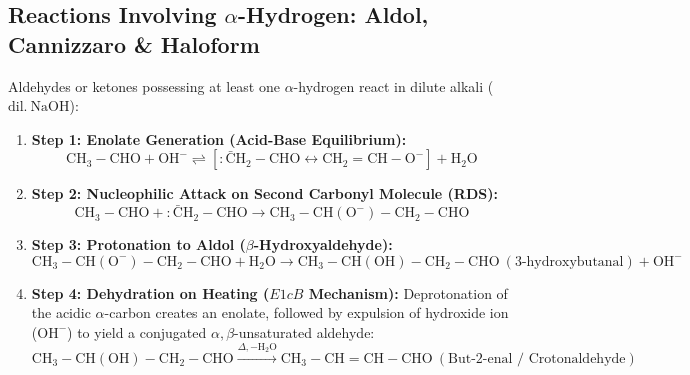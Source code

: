 \documentclass[10pt,a4paper]{article}
\begin{document}
\subsection{Reactions Involving \texorpdfstring{$\alpha$}{alpha}-Hydrogen: Aldol, Cannizzaro \& Haloform}

\begin{formulabox}
Aldehydes or ketones possessing at least one $\alpha$-hydrogen react in dilute alkali ($\mathrm{dil.\ NaOH}$):
\begin{enumerate}[leftmargin=*]
  \item \textbf{Step 1: Enolate Generation (Acid-Base Equilibrium):}
  \begin{equation}
    \mathrm{CH_3-CHO} + \mathrm{OH^-} \rightleftharpoons [\mathrm{:\bar{C}H_2-CHO} \longleftrightarrow \mathrm{CH_2=CH-O^-}] + \mathrm{H_2O}
  \end{equation}
  \item \textbf{Step 2: Nucleophilic Attack on Second Carbonyl Molecule (RDS):}
  \begin{equation}
    \mathrm{CH_3-CHO} + \mathrm{:\bar{C}H_2-CHO} \longrightarrow \mathrm{CH_3-CH(O^-)-CH_2-CHO}
  \end{equation}
  \item \textbf{Step 3: Protonation to Aldol ($\beta$-Hydroxyaldehyde):}
  \begin{equation}
    \mathrm{CH_3-CH(O^-)-CH_2-CHO} + \mathrm{H_2O} \longrightarrow \mathbf{\mathrm{CH_3-CH(OH)-CH_2-CHO}} \ (\text{3-hydroxybutanal}) + \mathrm{OH^-}
  \end{equation}
  \item \textbf{Step 4: Dehydration on Heating ($E1cB$ Mechanism):}
  Deprotonation of the acidic $\alpha$-carbon creates an enolate, followed by expulsion of hydroxide ion ($\mathrm{OH^-}$) to yield a conjugated $\alpha,\beta$-unsaturated aldehyde:
  \begin{equation}
    \mathrm{CH_3-CH(OH)-CH_2-CHO} \xrightarrow{\Delta, -\mathrm{H_2O}} \mathbf{\mathrm{CH_3-CH=CH-CHO}} \ (\text{But-2-enal / Crotonaldehyde})
  \end{equation}
\end{enumerate}
\end{formulabox}
\end{document}
